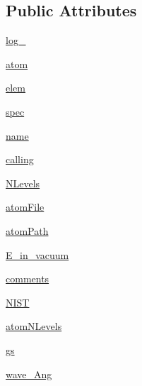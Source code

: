 \subsection*{Public Attributes}
\begin{DoxyCompactItemize}
\item 
\hyperlink{classpyneb_1_1core_1_1pynebcore_1_1___atom_data_ascii_aaddba4bcc59a7a5e69c08b2545939737}{log\-\_\-}
\item 
\hyperlink{classpyneb_1_1core_1_1pynebcore_1_1___atom_data_ascii_a5c98b93fd3ae381abca175c8baee6c0e}{atom}
\item 
\hyperlink{classpyneb_1_1core_1_1pynebcore_1_1___atom_data_ascii_a330140eda27048983020488e50c5858a}{elem}
\item 
\hyperlink{classpyneb_1_1core_1_1pynebcore_1_1___atom_data_ascii_a6a8de35e7e1695c3dd670b46c776f45e}{spec}
\item 
\hyperlink{classpyneb_1_1core_1_1pynebcore_1_1___atom_data_ascii_ab03fcf558862acb02a57ccd5accf155d}{name}
\item 
\hyperlink{classpyneb_1_1core_1_1pynebcore_1_1___atom_data_ascii_af5c364ae799620ff1af6870cf78ae19b}{calling}
\item 
\hyperlink{classpyneb_1_1core_1_1pynebcore_1_1___atom_data_ascii_a1203cca412f63428b8ff106d608b8d83}{N\-Levels}
\item 
\hyperlink{classpyneb_1_1core_1_1pynebcore_1_1___atom_data_ascii_a1163ceae1cb5263c39055a9c02f5c051}{atom\-File}
\item 
\hyperlink{classpyneb_1_1core_1_1pynebcore_1_1___atom_data_ascii_ae16a1eb022aac82bfee45f425a21ed90}{atom\-Path}
\item 
\hyperlink{classpyneb_1_1core_1_1pynebcore_1_1___atom_data_ascii_a468f4b6f8f580799b9d4a2a81e79941a}{E\-\_\-in\-\_\-vacuum}
\item 
\hyperlink{classpyneb_1_1core_1_1pynebcore_1_1___atom_data_ascii_a935b1baf76c6450653d1ebb673bc8f08}{comments}
\item 
\hyperlink{classpyneb_1_1core_1_1pynebcore_1_1___atom_data_ascii_a95b245a32e3666f6313e40a6ea8e627c}{N\-I\-S\-T}
\item 
\hyperlink{classpyneb_1_1core_1_1pynebcore_1_1___atom_data_ascii_a58e3b3de028fdda9d52cade8e378fe2d}{atom\-N\-Levels}
\item 
\hyperlink{classpyneb_1_1core_1_1pynebcore_1_1___atom_data_ascii_aed6d711337dfb385d65306e7f3c4d06d}{gs}
\item 
\hyperlink{classpyneb_1_1core_1_1pynebcore_1_1___atom_data_ascii_a1366f737e51b5a0f3706b68b0d06bfe5}{wave\-\_\-\-Ang}
\end{DoxyCompactItemize}
